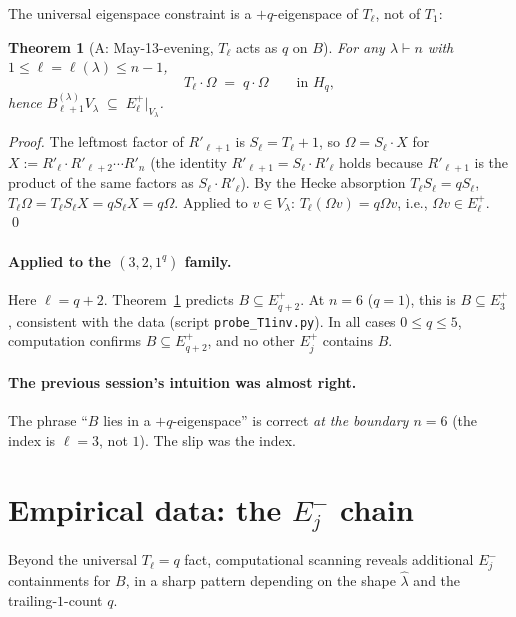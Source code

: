 \documentclass[11pt]{article}
\newtheorem{theorem}{Theorem}
\theoremstyle{definition}
\newcommand{\Hq}{H_q}
\newcommand{\Vlam}{V_\lambda}
\newcommand{\Bdec}{B_{\ell+1}^{(\lambda)}}
\newcommand{\Om}{\Omega}
\newcommand{\hatl}{\widehat\lambda}
\begin{document}
The universal eigenspace constraint is a $+q$-eigenspace of
$T_\ell$, not of $T_1$:

\begin{theorem}[A: May-13-evening, $T_\ell$ acts as $q$ on $B$]
\label{thm:T-ell}
For any $\lambda \vdash n$ with $1 \le \ell = \ell(\lambda) \le n-1$,
\[
   T_\ell \cdot \Om \;=\; q \cdot \Om \qquad \text{in } \Hq,
\]
hence $\Bdec \Vlam \;\subseteq\; E_\ell^+|_{\Vlam}$.
\end{theorem}

\begin{proof}
The leftmost factor of $R'_{\ell+1}$ is $S_\ell = T_\ell + 1$, so
$\Om = S_\ell \cdot X$ for $X := R'_\ell \cdot R'_{\ell+2} \cdots R'_n$
(the identity $R'_{\ell+1} = S_\ell \cdot R'_\ell$ holds because
$R'_{\ell+1}$ is the product of the same factors as $S_\ell \cdot
R'_\ell$).  By the Hecke absorption $T_\ell S_\ell = q S_\ell$,
$T_\ell \Om = T_\ell S_\ell X = q S_\ell X = q \Om$.  Applied to
$v \in \Vlam$: $T_\ell (\Om v) = q \Om v$, i.e., $\Om v \in E_\ell^+$.
\qed
\end{proof}

\paragraph{Applied to the $(3, 2, 1^q)$ family.}
Here $\ell = q + 2$.  Theorem~\ref{thm:T-ell} predicts
$B \subseteq E_{q+2}^+$.  At $n = 6$ ($q = 1$), this is
$B \subseteq E_3^+$, consistent with the data
(script \texttt{probe\_T1inv.py}).  In all cases $0 \le q \le 5$,
computation confirms $B \subseteq E_{q+2}^+$, and no other $E_j^+$
contains $B$.

\paragraph{The previous session's intuition was almost right.}
The phrase ``$B$ lies in a $+q$-eigenspace'' is correct \emph{at
the boundary $n = 6$} (the index is $\ell = 3$, not $1$).  The
slip was the index.

\section{Empirical data: the $E_j^-$ chain}\label{sec:data}

Beyond the universal $T_\ell = q$ fact, computational scanning reveals
additional $E_j^-$ containments for $B$, in a sharp pattern depending
on the shape $\hatl$ and the trailing-$1$-count $q$.
\end{document}
